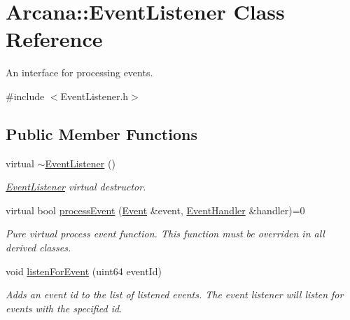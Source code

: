 \hypertarget{class_arcana_1_1_event_listener}{}\section{Arcana\+:\+:Event\+Listener Class Reference}
\label{class_arcana_1_1_event_listener}


An interface for processing events.  




{\ttfamily \#include $<$Event\+Listener.\+h$>$}

\subsection*{Public Member Functions}
\begin{DoxyCompactItemize}
\item 
\mbox{\label{class_arcana_1_1_event_listener_a10c321f4ac5dc480e531318bc7f69cf1}} 
virtual \mbox{\hyperlink{class_arcana_1_1_event_listener_a10c321f4ac5dc480e531318bc7f69cf1}{$\sim$\+Event\+Listener}} ()
\begin{DoxyCompactList}\small\item\em \mbox{\hyperlink{class_arcana_1_1_event_listener}{Event\+Listener}} virtual destructor. \end{DoxyCompactList}\item 
\mbox{\label{class_arcana_1_1_event_listener_a48fe1036f39b1bef9fd307c8fed29ad3}} 
virtual bool \mbox{\hyperlink{class_arcana_1_1_event_listener_a48fe1036f39b1bef9fd307c8fed29ad3}{process\+Event}} (\mbox{\hyperlink{class_arcana_1_1_event}{Event}} \&event, \mbox{\hyperlink{class_arcana_1_1_event_handler}{Event\+Handler}} \&handler)=0
\begin{DoxyCompactList}\small\item\em Pure virtual process event function. This function must be overriden in all derived classes. \end{DoxyCompactList}\item 
\mbox{\label{class_arcana_1_1_event_listener_acbbf1255b97403f3f368bbd2929cd55b}} 
void \mbox{\hyperlink{class_arcana_1_1_event_listener_acbbf1255b97403f3f368bbd2929cd55b}{listen\+For\+Event}} (uint64 event\+Id)
\begin{DoxyCompactList}\small\item\em Adds an event id to the list of listened events. The event listener will listen for events with the specified id. \end{DoxyCompactList}\item 

\end{DoxyCompactItemize}
